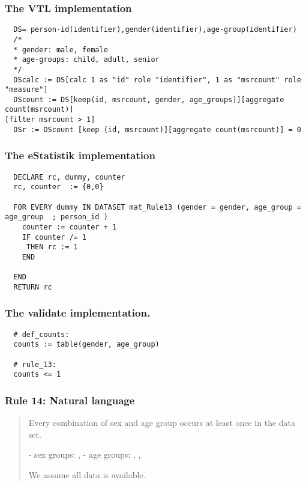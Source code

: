 \subsubsection*{The VTL implementation}
\begin{verbatim}
  DS= person-id(identifier),gender(identifier),age-group(identifier)
  /*
  * gender: male, female
  * age-groups: child, adult, senior
  */
  DScalc := DS[calc 1 as "id" role "identifier", 1 as "msrcount" role "measure"]
  DScount := DS[keep(id, msrcount, gender, age_groups)][aggregate count(msrcount)]
[filter msrcount > 1]
  DSr := DScount [keep (id, msrcount)][aggregate count(msrcount)] = 0
\end{verbatim}
\subsubsection*{The eStatistik implementation}
\begin{verbatim}
  DECLARE rc, dummy, counter
  rc, counter  := {0,0}

  FOR EVERY dummy IN DATASET mat_Rule13 (gender = gender, age_group = age_group  ; person_id )
    counter := counter + 1
    IF counter /= 1
     THEN rc := 1
    END

  END
  RETURN rc
\end{verbatim}
\subsubsection*{The validate implementation.}
\begin{verbatim}
  # def_counts:
  counts := table(gender, age_group)

  # rule_13:
  counts <= 1
\end{verbatim}


\newpage

\subsubsection*{  Rule 14: Natural language}
\begin{quote}


Every combination of sex and age group occurs at least once in the data set.

- sex groups: , 
- age groups: , ,  

We assume all data is available.


\end{quote}
